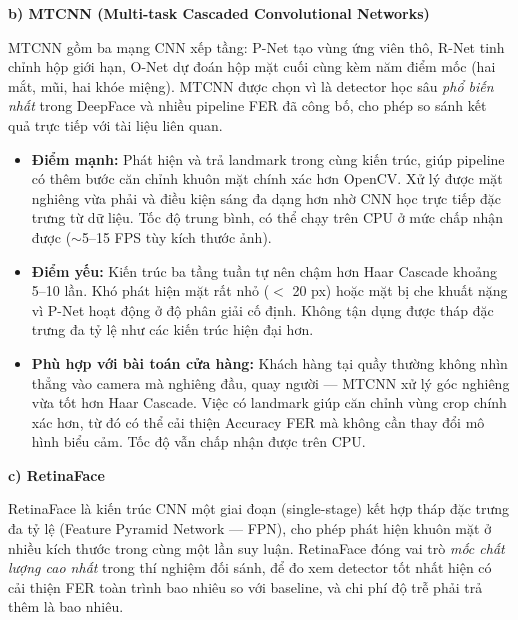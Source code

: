 \vspace{0.3cm}
\noindent\textbf{b) MTCNN (Multi-task Cascaded Convolutional Networks)}

MTCNN \cite{zhang2016mtcnn} gồm ba mạng CNN xếp tầng: P-Net tạo vùng ứng viên thô, R-Net tinh chỉnh hộp giới hạn, O-Net dự đoán hộp mặt cuối cùng kèm năm điểm mốc (hai mắt, mũi, hai khóe miệng). MTCNN được chọn vì là detector học sâu \textit{phổ biến nhất} trong DeepFace và nhiều pipeline FER đã công bố, cho phép so sánh kết quả trực tiếp với tài liệu liên quan.

\begin{itemize}
    \item \textbf{Điểm mạnh:} Phát hiện và trả landmark trong cùng kiến trúc, giúp pipeline có thêm bước căn chỉnh khuôn mặt chính xác hơn OpenCV. Xử lý được mặt nghiêng vừa phải và điều kiện sáng đa dạng hơn nhờ CNN học trực tiếp đặc trưng từ dữ liệu. Tốc độ trung bình, có thể chạy trên CPU ở mức chấp nhận được ($\sim$5--15 FPS tùy kích thước ảnh).
    \item \textbf{Điểm yếu:} Kiến trúc ba tầng tuần tự nên chậm hơn Haar Cascade khoảng 5--10 lần. Khó phát hiện mặt rất nhỏ ($<$ 20 px) hoặc mặt bị che khuất nặng vì P-Net hoạt động ở độ phân giải cố định. Không tận dụng được tháp đặc trưng đa tỷ lệ như các kiến trúc hiện đại hơn.
    \item \textbf{Phù hợp với bài toán cửa hàng:} Khách hàng tại quầy thường không nhìn thẳng vào camera mà nghiêng đầu, quay người --- MTCNN xử lý góc nghiêng vừa tốt hơn Haar Cascade. Việc có landmark giúp căn chỉnh vùng crop chính xác hơn, từ đó có thể cải thiện Accuracy FER mà không cần thay đổi mô hình biểu cảm. Tốc độ vẫn chấp nhận được trên CPU.
\end{itemize}

\vspace{0.3cm}
\noindent\textbf{c) RetinaFace}

RetinaFace \cite{retinaface} là kiến trúc CNN một giai đoạn (single-stage) kết hợp tháp đặc trưng đa tỷ lệ (Feature Pyramid Network --- FPN), cho phép phát hiện khuôn mặt ở nhiều kích thước trong cùng một lần suy luận. RetinaFace đóng vai trò \textit{mốc chất lượng cao nhất} trong thí nghiệm đối sánh, để đo xem detector tốt nhất hiện có cải thiện FER toàn trình bao nhiêu so với baseline, và chi phí độ trễ phải trả thêm là bao nhiêu.

